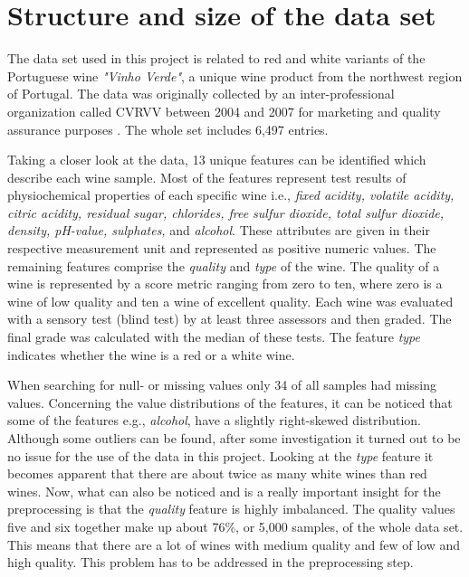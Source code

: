 \section{Structure and size of the data set}\label{sec:data_structure}


The data set used in this project is related to red and white variants of the Portuguese wine \textit{"Vinho Verde"}, a unique wine product from the northwest region of Portugal. The data was originally collected by an inter-professional organization called CVRVV between 2004 and 2007 for marketing and quality assurance purposes \citep{misc_wine_quality_186}. The whole set includes 6,497 entries.

Taking a closer look at the data, 13 unique features can be identified which describe each wine sample. Most of the features represent test results of physiochemical properties of each specific wine i.e., \textit{fixed acidity, volatile acidity, citric acidity, residual sugar, chlorides, free sulfur dioxide, total sulfur dioxide, density, pH-value, sulphates,}  and \textit{alcohol}. These attributes are given in their respective measurement unit and represented as positive numeric values. The remaining features comprise the \textit{quality} and \textit{type} of the wine. The quality of a wine is represented by a score metric ranging from zero to ten, where zero is a wine of low quality and ten a wine of excellent quality. Each wine was evaluated with a sensory test (blind test) by at least three assessors and then graded. The final grade was calculated with the median of these tests. The feature \textit{type} indicates whether the wine is a red or a white wine.

When searching for null- or missing values only 34 of all samples had missing values. Concerning the value distributions of the features, it can be noticed that some of the features e.g., \textit{alcohol}, have a slightly right-skewed distribution. Although some outliers can be found, after some investigation it turned out to be no issue for the use of the data in this project. Looking at the \textit{type} feature it becomes apparent that there are about twice as many white wines than red wines. Now, what can also be noticed and is a really important insight for the preprocessing is that the \textit{quality} feature is highly imbalanced. The quality values five and six together make up about 76\%, or 5,000 samples, of the whole data set. This means that there are a lot of wines with medium quality and few of low and high quality. This problem has to be addressed in the preprocessing step.
\pagebreak